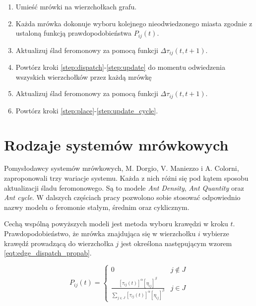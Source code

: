 {{        \begin{enumerate}
            \item \label{step:place} Umieść mrówki na wierzchołkach grafu.
            \item \label{step:dispatch} Każda mrówka dokonuje wyboru kolejnego nieodwiedzonego miasta zgodnie z ustaloną
            funkcją prawdopodobieństwa $P_{ij}(t)$.
            \item \label{step:update} Aktualizuj ślad feromonowy za pomocą funkcji $\Delta\tau_{ij}(t, t+1)$.
            \item Powtórz kroki \ref{step:dispatch}-\ref{step:update} do momentu odwiedzenia wszyskich wierzchołków
            przez każdą mrówkę
            \item \label{step:update_cycle} Aktualizuj ślad feromonowy za pomocą funkcji $\Delta\tau_{ij}(t, t+1)$.
            \item Powtórz kroki \ref{step:place}-\ref{step:update_cycle}.
        \end{enumerate}
    }

    \section{Rodzaje systemów mrówkowych}
    {
        Pomysłodawcy systemów mrówkowych, M. Dorgio, V. Maniezzo i A. Colorni, zaproponowali trzy wariacje systemu.
        Każda z nich różni się pod kątem sposobu aktualizacji śladu feromonowego. Są to modele \textit{Ant Density},
        \textit{Ant Quantity} oraz \textit{Ant cycle}. W dalszych częściach pracy pozwolono sobie stosować odpowiednio
        nazwy modelu o feromonie stałym, średnim oraz cyklicznym.

        Cechą wspólną powyższych modeli jest metoda wyboru krawędzi w kroku $t$. Prawdopodobieństwo, że mrówka
        znajdująca się w wierzchołku $i$ wybierze krawędź prowadzącą do wierzchołka $j$ jest określona następującym
        wzorem \ref{eqt:edge_dispatch_propab}.

        \begin{equation}\label{eqt:edge_dispatch_propab}
            P_{ij}(t) = \left\{\begin{matrix}
                0 & j \not\in J\\
                \frac{[\tau_{ij}(t)]^\alpha [\eta_{ij}]^\beta}{\sum_{j\in J} {[\tau_{ij}(t)]^\alpha [\eta_{ij}]^\beta} } & j \in J
                \end{matrix}\right.
        \end{equation}

}}
